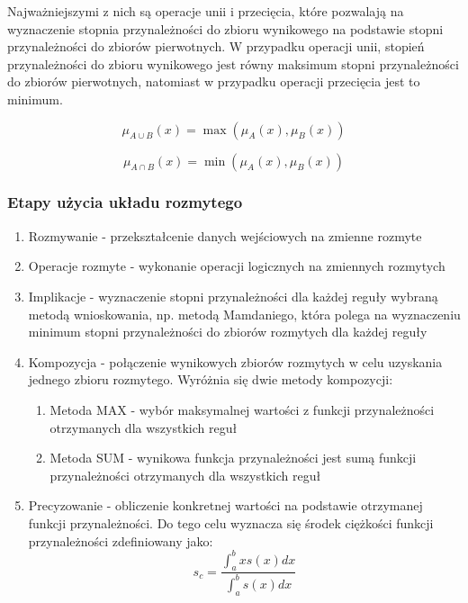 \documentclass{article}
\begin{document}
Najważniejszymi z nich są operacje unii i przecięcia, które
pozwalają na wyznaczenie stopnia przynależności do zbioru
wynikowego na podstawie stopni przynależności do zbiorów
pierwotnych. W przypadku operacji unii, stopień przynależności
do zbioru wynikowego jest równy maksimum stopni przynależności
do zbiorów pierwotnych, natomiast w przypadku operacji przecięcia
jest to minimum.

\begin{equation}
    \mu_{A \cup B}(x) = \max(\mu_A(x), \mu_B(x))
\end{equation}

\begin{equation}
    \mu_{A \cap B}(x) = \min(\mu_A(x), \mu_B(x))
\end{equation}

\subsubsection{Etapy użycia układu rozmytego} \label{sec:etapy}

\begin{enumerate}
    \item Rozmywanie - przekształcenie danych wejściowych na zmienne rozmyte
    \item Operacje rozmyte - wykonanie operacji logicznych na zmiennych rozmytych
    \item Implikacje - wyznaczenie stopni przynależności dla każdej reguły wybraną
    metodą wnioskowania, np. metodą Mamdaniego, która polega na wyznaczeniu
    minimum stopni przynależności do zbiorów rozmytych dla każdej reguły
    \item Kompozycja - połączenie wynikowych zbiorów rozmytych w celu uzyskania 
    jednego zbioru rozmytego. Wyróżnia się dwie metody kompozycji:
    \begin{enumerate}
        \item Metoda MAX - wybór maksymalnej wartości z funkcji przynależności otrzymanych dla
        wszystkich reguł
        \item Metoda SUM - wynikowa funkcja przynależności jest sumą funkcji przynależności
        otrzymanych dla wszystkich reguł
    \end{enumerate}
    \item Precyzowanie - obliczenie konkretnej wartości na podstawie otrzymanej funkcji przynależności.
    Do tego celu wyznacza się środek ciężkości funkcji przynależności zdefiniowany jako:
    \begin{equation}
        s_c = \frac{\int_{a}^{b} x s(x) dx}{\int_{a}^{b} s(x) dx}
    \end{equation}
\end{enumerate}
\end{document}
